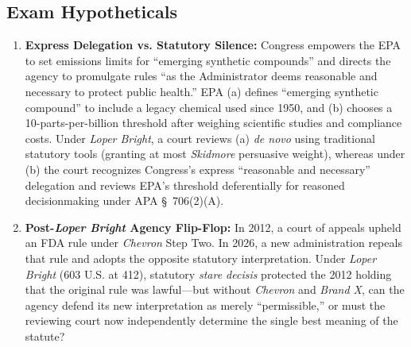 \documentclass[12pt]{article}
\begin{document}
\subsection{Exam Hypotheticals}

\begin{enumerate}
  \item \textbf{Express Delegation vs. Statutory Silence:} Congress empowers the EPA to set emissions limits for ``emerging synthetic compounds'' and directs the agency to promulgate rules ``as the Administrator deems reasonable and necessary to protect public health.'' EPA (a) defines ``emerging synthetic compound'' to include a legacy chemical used since 1950, and (b) chooses a 10-parts-per-billion threshold after weighing scientific studies and compliance costs. Under \textit{Loper Bright}, a court reviews (a) \textit{de novo} using traditional statutory tools (granting at most \textit{Skidmore} persuasive weight), whereas under (b) the court recognizes Congress's express ``reasonable and necessary'' delegation and reviews EPA's threshold deferentially for reasoned decisionmaking under APA \S~706(2)(A).
  \item \textbf{Post-\textit{Loper Bright} Agency Flip-Flop:} In 2012, a court of appeals upheld an FDA rule under \textit{Chevron} Step Two. In 2026, a new administration repeals that rule and adopts the opposite statutory interpretation. Under \textit{Loper Bright} (603 U.S. at 412), statutory \textit{stare decisis} protected the 2012 holding that the original rule was lawful---but without \textit{Chevron} and \textit{Brand X}, can the agency defend its new interpretation as merely ``permissible,'' or must the reviewing court now independently determine the single best meaning of the statute?
\end{enumerate}
\end{document}
